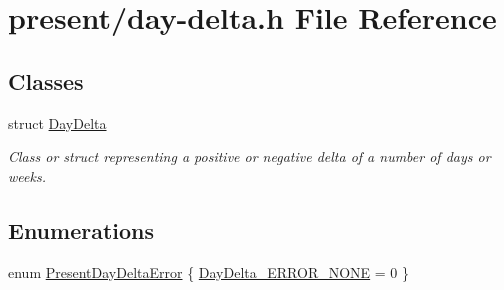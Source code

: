 \hypertarget{day-delta_8h}{\section{present/day-\/delta.h \-File \-Reference}
\label{day-delta_8h}
}
\subsection*{\-Classes}
\begin{DoxyCompactItemize}
\item 
struct \hyperlink{structDayDelta}{\-Day\-Delta}
\begin{DoxyCompactList}\small\item\em \-Class or struct representing a positive or negative delta of a number of days or weeks. \end{DoxyCompactList}\end{DoxyCompactItemize}
\subsection*{\-Enumerations}
\begin{DoxyCompactItemize}
\item 
enum \hyperlink{day-delta_8h_a1fc28c3187bc8bcf286a214ee7168f8f}{\-Present\-Day\-Delta\-Error} \{ \hyperlink{day-delta_8h_a1fc28c3187bc8bcf286a214ee7168f8fa2c7baebac5ad0ef02c710ea9ecb508b3}{\-Day\-Delta\-\_\-\-E\-R\-R\-O\-R\-\_\-\-N\-O\-N\-E} =  0
 \}
\end{DoxyCompactItemize}
